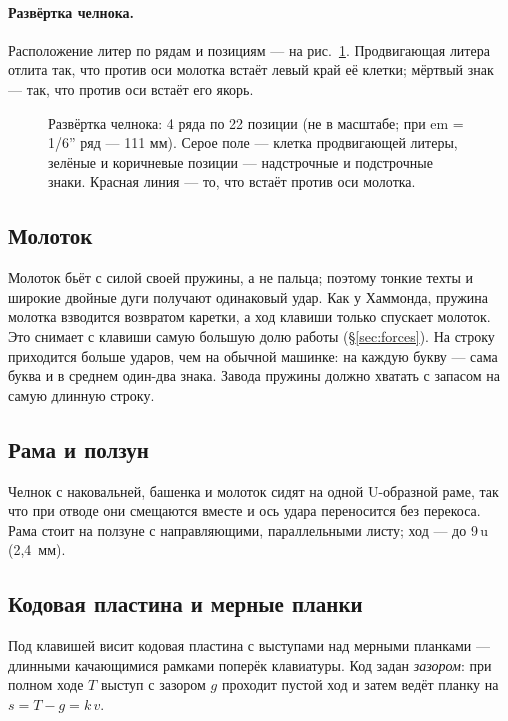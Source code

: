 \paragraph{Развёртка челнока.} Расположение литер по рядам и позициям — на рис.~\ref{fig:shuttle}. Продвигающая литера отлита так, что против оси молотка встаёт левый край её клетки; мёртвый знак — так, что против оси встаёт его якорь.

\begin{figure}[h]
\centering
\setlength\tgem{6.2mm}
\begin{tikzpicture}[x=\tgu,y=\tgu]

\end{tikzpicture}
\caption{Развёртка челнока: 4 ряда по 22 позиции (не в масштабе; при em = 1/6'' ряд — 111 мм). Серое поле — клетка продвигающей литеры, зелёные и коричневые позиции — надстрочные и подстрочные знаки. Красная линия — то, что встаёт против оси молотка.}
\label{fig:shuttle}
\end{figure}

\subsection{Молоток}

Молоток бьёт с силой своей пружины, а не пальца; поэтому тонкие техты и широкие двойные дуги получают одинаковый удар. Как у Хаммонда, пружина молотка взводится возвратом каретки, а ход клавиши только спускает молоток. Это снимает с клавиши самую большую долю работы (\S\ref{sec:forces}). На строку приходится больше ударов, чем на обычной машинке: на каждую букву — сама буква и в среднем один-два знака. Завода пружины должно хватать с запасом на самую длинную строку.

\subsection{Рама и ползун}

Челнок с наковальней, башенка и молоток сидят на одной U-образной раме, так что при отводе они смещаются вместе и ось удара переносится без перекоса. Рама стоит на ползуне с направляющими, параллельными листу; ход — до 9\,u (2,4~мм).

\subsection{Кодовая пластина и мерные планки}

Под клавишей висит кодовая пластина с выступами над мерными планками — длинными качающимися рамками поперёк клавиатуры. Код задан \emph{зазором}: при полном ходе $T$ выступ с зазором $g$ проходит пустой ход и затем ведёт планку на $s = T - g = k\,v$.

